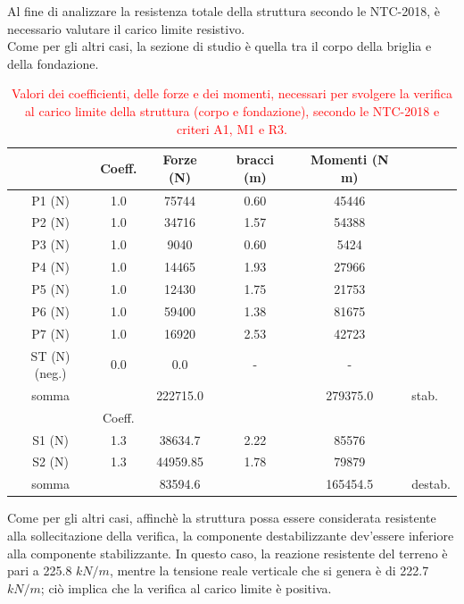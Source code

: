Al fine di analizzare la resistenza totale della struttura secondo le NTC-2018, è necessario valutare il carico limite resistivo.\\
Come per gli altri casi, la sezione di studio è quella tra il corpo della briglia e della fondazione.

\begin{table}[H] \centering
\caption{\textcolor{red}{Valori dei coefficienti, delle forze e dei momenti, necessari per svolgere la verifica al carico limite della struttura (corpo e fondazione), secondo le NTC-2018 e criteri A1, M1 e R3.}}
    \begin{tabular}{cccccl}
\toprule
& Coeff. & Forze (N) & bracci (m) & Momenti (N m) &         \\
\midrule
P1 (N) & 1.0         & 75744     & 0.60       & 45446         &         \\
P2 (N) & 1.0         & 34716     & 1.57       & 54388         &         \\
P3 (N) & 1.0         & 9040      & 0.60       & 5424          &         \\
P4 (N) & 1.0         & 14465     & 1.93       & 27966         &         \\
P5 (N) & 1.0         & 12430     & 1.75       & 21753         &         \\
P6 (N) & 1.0         & 59400     & 1.38       & 81675         &         \\
P7 (N) & 1.0         & 16920     & 2.53       & 42723         &         \\
ST (N) (neg.) & 0.0  & 0.0       & -          & -             &         \\
somma         &      & 222715.0  &            & 279375.0      & stab.   \\
\midrule
& Coeff. &     &            &               &         \\
S1 (N)        & 1.3  & 38634.7   & 2.22       & 85576         &         \\
S2 (N)        & 1.3  & 44959.85  & 1.78       & 79879         &         \\
somma         &      & 83594.6   &            & 165454.5      & destab. \\
\bottomrule
    \end{tabular}
    \end{table}

Come per gli altri casi, affinchè la struttura possa essere considerata resistente alla sollecitazione della verifica, la componente destabilizzante dev'essere inferiore alla componente stabilizzante. In questo caso, la reazione resistente del terreno è pari a 225.8 $kN/m$, mentre la tensione reale verticale che si genera è di 222.7 $kN/m$; ciò implica che la verifica al carico limite è positiva.